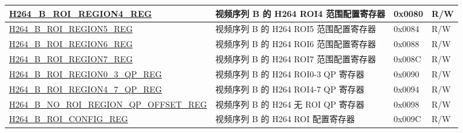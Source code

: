 \begin{longtable}{ | p{7cm} | p{6.2cm} | p{1.2cm} | p{1cm} | }
\hyperref[regdesc:H264BROIREGION4REG]{H264\_B\_ROI\_REGION4\_REG} & 视频序列 B 的 H264 ROI4 范围配置寄存器 & 0x0080 & R/W \\ \hline
\hyperref[regdesc:H264BROIREGION5REG]{H264\_B\_ROI\_REGION5\_REG} & 视频序列 B 的 H264 ROI5 范围配置寄存器 & 0x0084 & R/W \\ \hline
\hyperref[regdesc:H264BROIREGION6REG]{H264\_B\_ROI\_REGION6\_REG} & 视频序列 B 的 H264 ROI6 范围配置寄存器 & 0x0088 & R/W \\ \hline
\hyperref[regdesc:H264BROIREGION7REG]{H264\_B\_ROI\_REGION7\_REG} & 视频序列 B 的 H264 ROI7 范围配置寄存器 & 0x008C & R/W \\ \hline
\hyperref[regdesc:H264BROIREGION03QPREG]{H264\_B\_ROI\_REGION0\_3\_QP\_REG} & 视频序列 B 的 H264 ROI0-3 QP 寄存器 & 0x0090 & R/W \\ \hline
\hyperref[regdesc:H264BROIREGION47QPREG]{H264\_B\_ROI\_REGION4\_7\_QP\_REG} & 视频序列 B 的 H264 ROI4-7 QP 寄存器 & 0x0094 & R/W \\ \hline
\hyperref[regdesc:H264BNOROIREGIONQPOFFSETREG]{H264\_B\_NO\_ROI\_REGION\_QP\_OFFSET\_REG} & 视频序列 B 的 H264 无 ROI QP 寄存器 & 0x0098 & R/W \\ \hline
\hyperref[regdesc:H264BROICONFIGREG]{H264\_B\_ROI\_CONFIG\_REG} & 视频序列 B 的 H264 ROI 配置寄存器 & 0x009C & R/W \\ \hline


\end{longtable}
